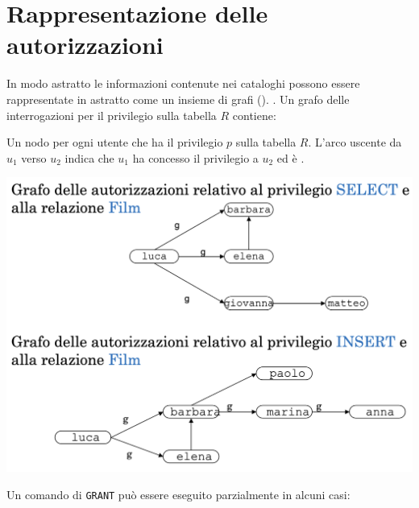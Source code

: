 \documentclass[12pt, a4paper]{report}
\begin{document}
    \section{Rappresentazione delle autorizzazioni}
    In modo astratto le informazioni contenute nei cataloghi possono essere rappresentate in astratto come un insieme di grafi (). . Un grafo delle interrogazioni per il privilegio sulla tabella $R$ contiene:
    \begin{center}
    \end{center} 
    Un nodo per ogni utente che ha il privilegio $p$ sulla tabella $R$. L'arco uscente da $u_{1}$ verso $u_{2}$ indica che $u_{1}$ ha concesso il privilegio a $u_{2}$ ed è .
    \begin{center}
        \includegraphics[scale=0.4]{Appunti Latex/Immagini/esempioautorizzazioni.png}
    \end{center}
    Un comando di \texttt{GRANT} può essere eseguito parzialmente in alcuni casi:
\end{document}
